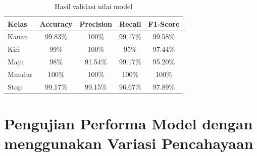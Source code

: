\begin{longtable}{|l|c|c|c|c|}
  \caption{Hasil validasi nilai model}
  \label{tb:vs_model6} \\
  \hline
  \rowcolor[HTML]{C0C0C0} 
  \textbf{Kelas} & \textbf{Accuracy} & \textbf{Precision} & \textbf{Recall} & \textbf{F1-Score} \\ \hline
  Kanan    & 99.83\%            & 100\%             & 99.17\%           & 99.58\%            \\ \hline
  Kiri     & 99\%          & 100\%           & 95\%           & 97.44\%           \\ \hline
  Maju      & 98\%          & 91.54\%           & 99.17\%          & 95.20\%          \\ \hline
  Mundur     & 100\%            & 100\%             & 100\%           & 100\%            \\ \hline
  Stop  & 99.17\%            & 99.15\%             & 96.67\%           & 97.89\%            \\ \hline
\end{longtable}

\section{Pengujian Performa Model dengan menggunakan Variasi Pencahayaan}

